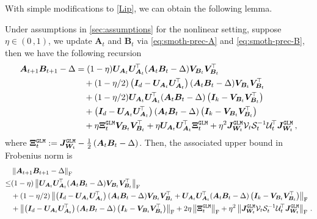 With simple modifications to \cref{Lip}, we can obtain the following lemma.
\begin{lemma}\label{smo-Lip}
    Under assumptions in \cref{sec:assumptions} for the nonlinear setting, suppose $\eta\in\left(0\,,1\right)$, we update $\bm A_t$ and $\bm B_t$ via \cref{eq:smoth-prec-A} and \cref{eq:smoth-prec-B}, then we have the following recursion
    \begin{align}\label{smo-recursion}
    \bm A_{t+1}\bm B_{t+1} - \Delta & = (1-\eta)\bm U_{\bm A_t} \bm U_{\bm A_t}^{\!\top}(\bm A_t \bm B_t - \Delta)\bm V_{\bm B_t} \bm V_{\bm B_t}^{\!\top}\nonumber\\
    & \quad + (1-\eta/2)\left(\bm I_d - \bm U_{\bm A_t} \bm U_{\bm A_t}^{\!\top}\right)(\bm A_t \bm B_t - \Delta)\bm V_{\bm B_t} \bm V_{\bm B_t}^{\!\top}\nonumber\\
    & \quad + (1-\eta/2)\bm U_{\bm A_t} \bm U_{\bm A_t}^{\!\top}(\bm A_t \bm B_t - \Delta)\left(\bm I_k - \bm V_{\bm B_t} \bm V_{\bm B_t}^{\!\top}\right)\nonumber\\
    & \quad + \left(\bm I_d - \bm U_{\bm A_t} \bm U_{\bm A_t}^{\!\top}\right)(\bm A_t \bm B_t - \Delta)\left(\bm I_k - \bm V_{\bm B_t} \bm V_{\bm B_t}^{\!\top}\right)\nonumber\\
    & \quad + \eta \bm \Xi^{\tt GLM}_t \bm V_{\bm B_t} \bm V_{\bm B_t}^{\!\top} + \eta \bm U_{\bm A_t} \bm U_{\bm A_t}^{\!\top} \bm \Xi^{\tt GLM}_t + \eta^2 \bm J_{\bm W_t}^{\tt GLM} \mathcal{V}_t \mathcal{S}_t^{-1} \mathcal{U}^{\!\top}_t \bm J_{\bm W_t}^{\tt GLM}\,,
    \end{align}
    where $\bm \Xi^{\tt GLM}_t:=\bm J_{\bm W_t}^{\tt GLM}-\frac{1}{2}\left(\bm A_t \bm B_t - \Delta\right)$. Then, the associated upper bound in Frobenius norm is
    \begin{align}\label{smo-lip-upper}
        & \left\|\bm A_{t+1}\bm B_{t+1} - \Delta\right\|_{\rm F} \\
        \leq & (1-\eta)\left\|\bm U_{\bm A_t} \bm U_{\bm A_t}^{\!\top}(\bm A_t \bm B_t - \Delta)\bm V_{\bm B_t} \bm V_{\bm B_t}^{\!\top}\right\|_{\rm F}\nonumber\\
        & + (1-\eta/2) \left\|\left(\bm I_d - \bm U_{\bm A_t} \bm U_{\bm A_t}^{\!\top}\right)(\bm A_t \bm B_t - \Delta)\bm V_{\bm B_t} \bm V_{\bm B_t}^{\!\top}+\bm U_{\bm A_t} \bm U_{\bm A_t}^{\!\top}(\bm A_t \bm B_t - \Delta)\left(\bm I_k - \bm V_{\bm B_t} \bm V_{\bm B_t}^{\!\top}\right)\right\|_{\rm F}\nonumber\\
        & + \left\|\left(\bm I_d - \bm U_{\bm A_t} \bm U_{\bm A_t}^{\!\top}\right)(\bm A_t \bm B_t - \Delta)\left(\bm I_k - \bm V_{\bm B_t} \bm V_{\bm B_t}^{\!\top}\right)\right\|_{\rm F} + 2\eta\left\|\bm \Xi^{\tt GLM}_t\right\|_{\rm F}+\eta^2\left\|\bm J_{\bm W_t}^{\tt GLM} \mathcal{V}_t \mathcal{S}_t^{-1} \mathcal{U}^{\!\top}_t \bm J_{\bm W_t}^{\tt GLM}\right\|_{\rm F}\,.
    \end{align}
\end{lemma}
